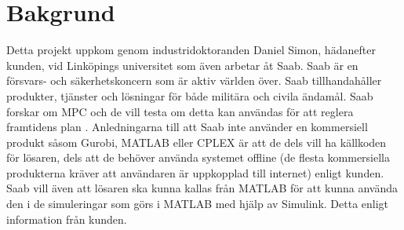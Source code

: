 \section{Bakgrund}    
Detta projekt uppkom genom industridoktoranden Daniel Simon, hädanefter kunden, vid Linköpings universitet som även arbetar åt Saab. Saab är en försvars- och säkerhetskoncern som är aktiv världen över. Saab tillhandahåller produkter, tjänster och lösningar för både militära och civila ändamål. \citep{SAABbrief}
\newline
\newline
Saab forskar om MPC och de vill testa om detta kan användas för att reglera framtidens plan \citep{danielSimon}.
Anledningarna till att Saab inte använder en kommersiell produkt såsom Gurobi, MATLAB eller CPLEX är att de dels vill ha källkoden för lösaren, dels att de behöver använda systemet offline (de flesta kommersiella produkterna kräver att användaren är uppkopplad till internet) enligt kunden.  
\newline
\newline
Saab vill även att lösaren ska kunna kallas från MATLAB för att kunna använda den i de simuleringar som görs i MATLAB med hjälp av Simulink. Detta enligt information från kunden.  
